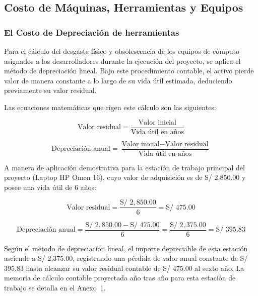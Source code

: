 \subsection{Costo de Máquinas, Herramientas y Equipos}
\subsubsection{El Costo de Depreciación de herramientas}

Para el cálculo del desgaste físico y obsolescencia de los equipos de cómputo asignados a los desarrolladores durante la ejecución del proyecto, se aplica el método de depreciación lineal. Bajo este procedimiento contable, el activo pierde valor de manera constante a lo largo de su vida útil estimada, deduciendo previamente su valor residual.

Las ecuaciones matemáticas que rigen este cálculo son las siguientes:

\begin{equation}
    \text{Valor residual} = \frac{\text{Valor inicial}}{\text{Vida útil en años}}
\end{equation}

\begin{equation}
    \text{Depreciación anual} = \frac{\text{Valor inicial} - \text{Valor residual}}{\text{Vida útil en años}}
\end{equation}

A manera de aplicación demostrativa para la estación de trabajo principal del proyecto (Laptop HP Omen 16), cuyo valor de adquisición es de S/ 2,850.00 y posee una vida útil de 6 años:

\begin{equation*}
    \text{Valor residual} = \frac{\text{S/ } 2,850.00}{6} = \text{S/ } 475.00
\end{equation*}

\begin{equation*}
    \text{Depreciación anual} = \frac{\text{S/ } 2,850.00 - \text{S/ } 475.00}{6} = \frac{\text{S/ } 2,375.00}{6} = \text{S/ } 395.83
\end{equation*}

Según el método de depreciación lineal, el importe depreciable de esta estación asciende a S/ 2,375.00, 
registrando una pérdida de valor anual constante de S/ 395.83 hasta alcanzar su valor residual contable de S/ 475.00 al sexto año. 
La memoria de cálculo contable proyectada año tras año para esta estación de trabajo se detalla en el Anexo~1.

